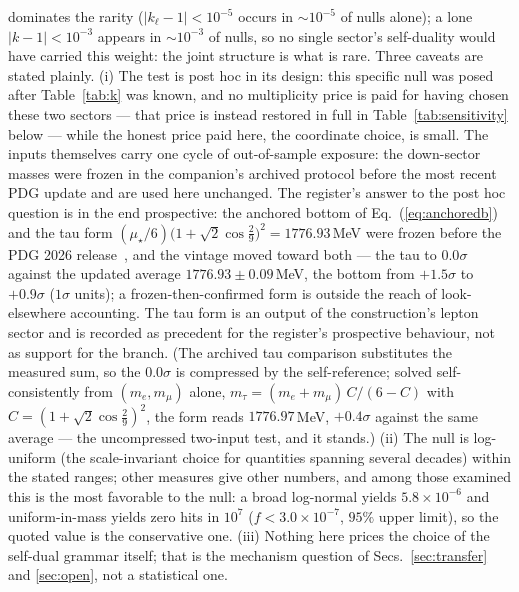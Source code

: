 \documentclass[11pt]{article}
\begin{document}
dominates the rarity ($|k_\ell-1|<10^{-5}$ occurs in $\sim10^{-5}$ of nulls
alone); a lone $|k-1|<10^{-3}$ appears in $\sim10^{-3}$ of nulls, so no single
sector's self-duality would have carried this weight: the joint structure is what is rare. Three caveats are stated plainly. (i) The test is post hoc in its design: this specific null was posed after Table~\ref{tab:k} was known, and no multiplicity price is paid for having chosen these two sectors --- that price is instead restored in full in Table~\ref{tab:sensitivity} below --- while the honest price paid here, the coordinate choice, is small. The inputs themselves carry one cycle of out-of-sample exposure: the down-sector masses were frozen in the companion's archived protocol before the most recent PDG update and are used here unchanged. The register's answer to the post hoc question is in the end prospective: the anchored bottom of Eq.~(\ref{eq:anchoredb}) and the tau form $(\mu_\star/6)\bigl(1+\sqrt2\cos\tfrac{2}{9}\bigr)^2 = 1776.93$\,MeV were frozen before the PDG 2026 release~\cite{Prereg}, and the vintage moved toward both --- the tau to $0.0\sigma$ against the updated average $1776.93\pm0.09$\,MeV, the bottom from $+1.5\sigma$ to $+0.9\sigma$ ($1\sigma$ units); a frozen-then-confirmed form is outside the reach of look-elsewhere accounting. The tau form is an output of the construction's lepton sector and is recorded as precedent for the register's prospective behaviour, not as support for the branch. (The archived tau comparison substitutes the measured sum, so the $0.0\sigma$ is compressed by the self-reference; solved self-consistently from $(m_e, m_\mu)$ alone, $m_\tau = (m_e+m_\mu)\,C/(6-C)$ with $C = (1+\sqrt2\cos\tfrac{2}{9})^2$, the form reads $1776.97$\,MeV, $+0.4\sigma$ against the same average --- the uncompressed two-input test, and it stands.) (ii) The null is log-uniform (the scale-invariant choice for quantities spanning several decades) within the stated ranges; other measures give other numbers, and among those examined this is the most favorable to the null: a broad log-normal yields $5.8\times10^{-6}$ and uniform-in-mass yields zero hits in $10^7$ ($f < 3.0\times10^{-7}$, $95\%$ upper limit), so the quoted value is the conservative one. (iii) Nothing here prices the choice of the self-dual grammar itself;
that is the mechanism question of Secs.~\ref{sec:transfer} and \ref{sec:open},
not a statistical one.
\end{document}

